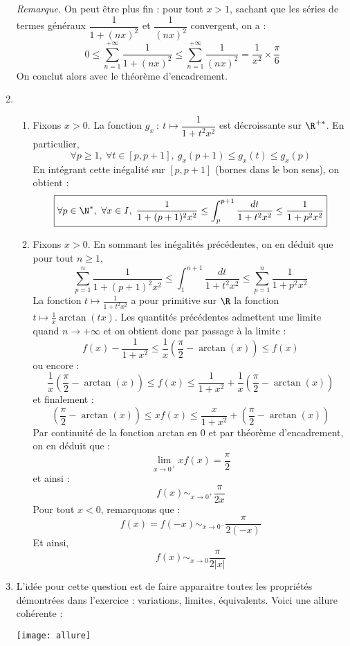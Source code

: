 \documentclass[a4paper,10pt]{report}
\begin{document}
\begin{enumerate}
\medskip

\noindent \textit{Remarque.} On peut être plus fin : pour tout $x>1$, sachant que les séries de termes généraux $\dfrac{1}{1+(nx)^2}$ et $\dfrac{1}{(nx)^2}$ convergent, on a :
$$ 0 \leq \sum_{n=1}^{+ \infty} \dfrac{1}{1+(nx)^2} \leq \sum_{n=1}^{+ \infty} \dfrac{1}{(nx)^2} = \frac{1}{x^2} \times \frac{\pi}{6}$$
On conclut alors avec le théorème d'encadrement.
\item
\begin{enumerate}
\item Fixons $x>0$. La fonction $g_x\ :\ t\mapsto \dfrac{1}{1+t^2x^2}$ est d\'ecroissante sur $\R^{+*}$. En particulier,
\[\forall p\geq 1,\ \forall t\in [p,p+1],\ g_x(p+1)\leq g_x(t)\leq g_x(p)\]
En int\'egrant cette in\'egalit\'e sur $[p,p+1]$ (bornes dans le bon sens), on obtient :
\[\boxed{\forall p\in \N^*,\ \forall x\in I, \; \frac{1}{1+(p+1)^2x^2}\leq \int_p^{p+1}\frac{dt}{1+t^2x^2}\leq \frac{1}{1+p^2x^2}}\]
\item Fixons $x>0$. En sommant les inégalités précédentes, on en déduit que pour tout $n \geq 1$,
\[ \sum_{p=1}^n \frac{1}{1+(p+1)^2x^2}\leq \int_1^{n+1}\frac{dt}{1+t^2x^2}\leq \sum_{p=1}^n\frac{1}{1+p^2x^2}\]
La fonction $t\mapsto \frac{1}{1+t^2x^2}$ a pour primitive sur $\R$ la fonction $t\mapsto \frac{1}{x}\arctan(tx)$. Les quantit\'es pr\'ec\'edentes admettent une limite quand $n \rightarrow +\infty$ et on obtient donc par passage à la limite :
\[f(x)-\frac{1}{1+x^2}\leq \frac{1}{x} \left(\frac{\pi}{2} - \arctan(x) \right) \leq f(x)\]
ou encore :
\[ \frac{1}{x} \left(\frac{\pi}{2} - \arctan(x) \right)\leq f(x)\leq \frac{1}{1+x^2}+ \frac{1}{x} \left(\frac{\pi}{2} - \arctan(x) \right)\]
et finalement :
$$ \left(\frac{\pi}{2} - \arctan(x) \right) \leq x f(x) \leq \frac{x}{1+x^2}  +\left(\frac{\pi}{2} - \arctan(x) \right) $$
Par continuité de la fonction arctan en $0$ et par théorème d'encadrement, on en déduit que :
$$ \lim_{x \rightarrow 0^+} x f(x) = \frac{\pi}{2}$$
et ainsi :
\[\boxed{f(x)\mathop{\sim}_{x\to 0^+} \frac{\pi}{2x}}\]
Pour tout $x<0$, remarquons que :
\[\boxed{f(x)=f(-x) \mathop{\sim}_{x\to 0^{-}} \frac{\pi}{2(-x)}}\]
Et ainsi,
\[\boxed{f(x)\mathop{\sim}_{x\to 0} \frac{\pi}{2 \vert x \vert }}\]
\end{enumerate}
\item L'idée pour cette question est de faire apparaitre toutes les propriétés démontrées dans l'exercice : variations, limites, équivalents. Voici une allure cohérente :

\begin{center}
\texttt{[image: allure]}
\end{center}
\end{enumerate}
\end{document}

